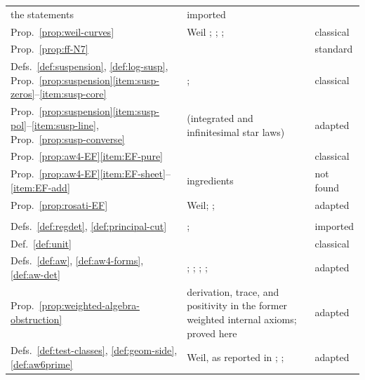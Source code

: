 \documentclass[11pt]{amsart}
\theoremstyle{plain}
\theoremstyle{definition}
\theoremstyle{remark}
\numberwithin{equation}{section}
\begin{document}
{\begin{longtable}{@{}>{\raggedright\arraybackslash}p{}
>{\raggedright\arraybackslash}p{}
>{\raggedright\arraybackslash}p{}@{}}
the statements & imported\\
Prop.~\ref{prop:weil-curves} & Weil \cite{Weil1941RHFunctionFields};
\cite[Th\'eor\`eme~2, p.~394]{Serre1960Analogues};
\cite[Lemma~4.6 and Theorem~4.7]{Kleiman1968Cycles};
\cite[Theorem~1.27, p.~21]{Milne2016RHFF} & classical\\
Prop.~\ref{prop:ff-N7} & \cite[p.~3]{Deninger2010HilbertPolya} &
standard\\
Defs.~\ref{def:suspension}, \ref{def:log-susp},
Prop.~\ref{prop:suspension}\ref{item:susp-zeros}--\ref{item:susp-core}
& \cite[\S2, Corollary~(2.6) and~(2.8), and \S4, p.~16]%
{Deninger1994Motivic}; \cite[Remark~7.2]{Hesselholt2016THHZeta} &
classical\\
Prop.~\ref{prop:suspension}\ref{item:susp-pol}--\ref{item:susp-line},
Prop.~\ref{prop:susp-converse} & \cite[p.~4]{Deninger2010HilbertPolya}
(integrated and infinitesimal star laws) & adapted\\
Prop.~\ref{prop:aw4-EF}\ref{item:EF-pure} &
\cite[Lemma~4.6]{Kleiman1968Cycles} & classical\\
Prop.~\ref{prop:aw4-EF}\ref{item:EF-sheet}--\ref{item:EF-add} &
ingredients \cite[Lemma~4.6]{Kleiman1968Cycles} & not found\\
Prop.~\ref{prop:rosati-EF} & Weil; \cite[\S14]{MilneAV2008};
\cite[Lemma~4.6]{Kleiman1968Cycles} & adapted\\
\multicolumn{3}{@{}l}{\emph{Section~\ref{sec:axioms}}}\\
Defs.~\ref{def:regdet}, \ref{def:principal-cut} &
\cite[(1.1)--(1.7), pp.~3--6]{Deninger1994Motivic};
\cite[Definition~2.1]{FlachMorin2020DeningerWeilArakelov} & imported\\
Def.~\ref{def:unit} & \cite[pp.~167--168]{Deninger1998Analogies} &
classical\\
Defs.~\ref{def:aw}, \ref{def:aw4-forms}, \ref{def:aw-det} &
\cite[Conjecture~2, p.~3, and pp.~4--6]{Deninger2010HilbertPolya};
\cite[Conjecture~2.3, p.~522]{FlachMorin2020DeningerWeilArakelov};
\cite[p.~168, p.~172]{Deninger1998Analogies};
\cite[(7.13), (7.19)]{Deninger1994Motivic};
\cite[Lemma~4.6]{Kleiman1968Cycles} & adapted\\
Prop.~\ref{prop:weighted-algebra-obstruction} &
derivation, trace, and positivity in the former weighted internal
axioms; proved here & adapted\\
Defs.~\ref{def:test-classes}, \ref{def:geom-side}, \ref{def:aw6prime}
& Weil, as reported in \cite[\S V]{Bombieri2000Clay};
\cite[(4) and (10), pp.~170--172]{Deninger1998Analogies};
\cite[(17)--(19), pp.~15--16]{Deninger2001NumberTheory} & adapted\\

\end{longtable}}
\end{document}
